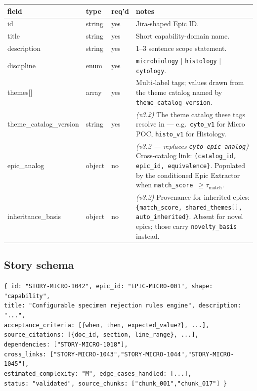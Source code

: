 \documentclass[10pt,letterpaper]{article}
\begin{document}
\begin{tabularx}{\textwidth}{@{}>{\ttfamily}p{3.2cm}p{2.0cm}p{1.4cm}X@{}}
\toprule
\textbf{field} & \textbf{type} & \textbf{req'd} & \textbf{notes} \\
\midrule
id & string & yes & Jira-shaped Epic ID. \\
title & string & yes & Short capability-domain name. \\
description & string & yes & 1--3 sentence scope statement. \\
discipline & enum & yes & \texttt{microbiology} $|$ \texttt{histology} $|$ \texttt{cytology}. \\
themes[] & array & yes & Multi-label tags; values drawn from the theme catalog named by \texttt{theme\_catalog\_version}. \\
theme\_catalog\_version & string & yes & \emph{(v3.2)} The theme catalog these tags resolve in --- e.g.\ \texttt{cyto\_v1} for Micro POC, \texttt{histo\_v1} for Histology. \\
epic\_analog & object & no & \emph{(v3.2 --- replaces \texttt{cyto\_epic\_analog})} Cross-catalog link: \texttt{\{catalog\_id, epic\_id, equivalence\}}. Populated by the conditioned Epic Extractor when \texttt{match\_score $\geq \tau_{\text{match}}$}. \\
inheritance\_basis & object & no & \emph{(v3.2)} Provenance for inherited epics: \texttt{\{match\_score, shared\_themes[], auto\_inherited\}}. Absent for novel epics; those carry \texttt{novelty\_basis} instead. \\
\bottomrule
\end{tabularx}

\subsection{Story schema}

\noindent\texttt{\scriptsize \{ id: "STORY-MICRO-1042", epic\_id: "EPIC-MICRO-001", shape: "capability",\\
\hspace*{1em}title: "Configurable specimen rejection rules engine", description: "...",\\
\hspace*{1em}acceptance\_criteria: [\{when, then, expected\_value?\}, ...],\\
\hspace*{1em}source\_citations: [\{doc\_id, section, line\_range\}, ...],\\
\hspace*{1em}dependencies: ["STORY-MICRO-1018"],\\
\hspace*{1em}cross\_links:  ["STORY-MICRO-1043","STORY-MICRO-1044","STORY-MICRO-1045"],\\
\hspace*{1em}estimated\_complexity: "M", edge\_cases\_handled: [...],\\
\hspace*{1em}status: "validated", source\_chunks: ["chunk\_001","chunk\_017"] \}}
\end{document}
